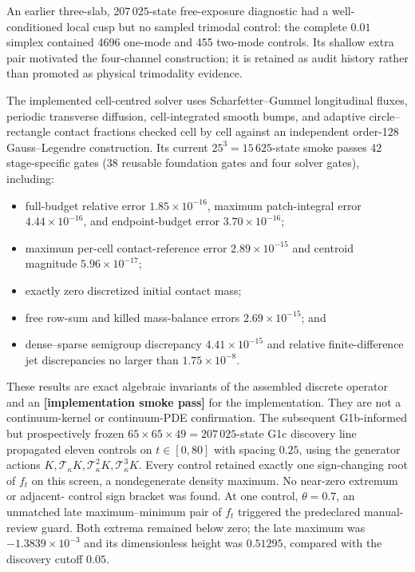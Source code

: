 \documentclass[aps,physrev,reprint,amsmath,amssymb,longbibliography,floatfix]{revtex4-2}
\newcommand{\Tkill}{\mathcal T_{\kappa}}
\newcommand{\status}[1]{\textbf{[#1]}}
\begin{document}
An earlier three-slab, $207\,025$-state free-exposure diagnostic had a
well-conditioned local cusp but no sampled trimodal control: the complete
$0.01$ simplex contained 4696 one-mode and 455 two-mode controls.  Its shallow
extra pair motivated the four-channel construction; it is retained as audit
history rather than promoted as physical trimodality evidence.

The implemented cell-centred solver uses Scharfetter--Gummel longitudinal
fluxes, periodic transverse diffusion, cell-integrated smooth bumps, and
adaptive circle--rectangle contact fractions checked cell by cell against an
independent order-128 Gauss--Legendre construction.  Its current
$25^3=15\,625$-state smoke passes 42 stage-specific gates (38 reusable
foundation gates and four solver gates), including:
\begin{itemize}
\item full-budget relative error $1.85\times10^{-16}$, maximum patch-integral
  error $4.44\times10^{-16}$, and endpoint-budget error
  $3.70\times10^{-16}$;
\item maximum per-cell contact-reference error $2.89\times10^{-15}$ and
  centroid magnitude $5.96\times10^{-17}$;
\item exactly zero discretized initial contact mass;
\item free row-sum and killed mass-balance errors
  $2.69\times10^{-15}$; and
\item dense--sparse semigroup discrepancy $4.41\times10^{-15}$ and relative
  finite-difference jet discrepancies no larger than $1.75\times10^{-8}$.
\end{itemize}
These results are exact algebraic invariants of the assembled discrete
operator and an \status{implementation smoke pass} for the implementation.
They are not a continuum-kernel or continuum-PDE confirmation.  The
subsequent G1b-informed but prospectively frozen
$65\times65\times49=207\,025$-state G1c discovery line propagated eleven
controls on $t\in[0,80]$ with spacing $0.25$, using the generator actions
$K,\Tkill K,\Tkill^2K,\Tkill^3K$.  Every control retained exactly one
sign-changing root of $f_t$ on this screen, a nondegenerate density maximum.
No near-zero extremum or adjacent-
control sign bracket was found.  At one control, $\theta=0.7$, an unmatched
late maximum--minimum pair of $f_t$ triggered the predeclared manual-review
guard.  Both extrema remained below zero; the late maximum was
$-1.3839\times10^{-3}$ and its dimensionless height was $0.51295$, compared
with the discovery cutoff $0.05$.
\end{document}
